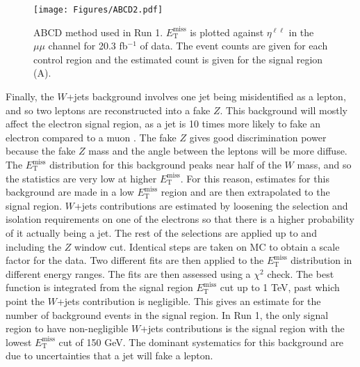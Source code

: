 \begin{figure}[ht]
\centering
\texttt{[image: Figures/ABCD2.pdf]}
\caption[ABCD method used in Run 1]{ABCD method used in Run 1. $E_\text{T}^\text{miss}$ is plotted against $\eta^{\ell\ell}$ in the $\mu\mu$ channel for 20.3 fb$^{-1}$ of data. The event counts are given for each control region and the estimated count is given for the signal region (A).}
\label{fig:abcd}
\end{figure}

Finally, the $W$+jets background involves one jet being misidentified as a lepton, and so two leptons are reconstructed into a fake $Z$. This background will mostly affect the electron signal region, as a jet is 10 times more likely to fake an electron compared to a muon \cite{Barberio:1529950}. The fake $Z$ gives good discrimination power because the fake $Z$ mass and the angle between the leptons will be more diffuse. The $E_\text{T}^\text{miss}$ distribution for this background peaks near half of the $W$ mass, and so the statistics are very low at higher $E_\text{T}^\text{miss}$. For this reason, estimates for this background are made in a low $E_\text{T}^\text{miss}$ region and are then extrapolated to the signal region. $W$+jets contributions are estimated by loosening the selection and isolation requirements on one of the electrons so that there is a higher probability of it actually being a jet. The rest of the selections are applied up to and including the $Z$ window cut. Identical steps are taken on MC to obtain a scale factor for the data. Two different fits are then applied to the $E_\text{T}^\text{miss}$ distribution in different energy ranges. The fits are then assessed using a $\chi^2$ check. The best function is integrated from the signal region $E_\text{T}^\text{miss}$ cut up to 1 TeV, past which point the $W$+jets contribution is negligible. This gives an estimate for the number of background events in the signal region. In Run 1, the only signal region to have non-negligible $W$+jets contributions is the signal region with the lowest $E_\text{T}^\text{miss}$ cut of 150 GeV. The dominant systematics for this background are due to uncertainties that a jet will fake a lepton.
